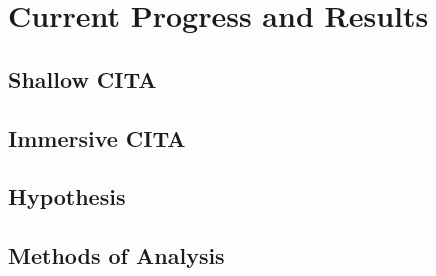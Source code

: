 \chapter[Chapter 6: Current Progress and Results]{Current Progress and Results}

\section{Shallow CITA}

\section{Immersive CITA}

\section{Hypothesis}

\section{Methods of Analysis}

